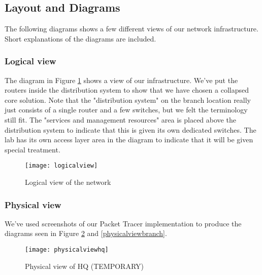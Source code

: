 \subsection{Layout and Diagrams}


The following diagrams shows a few different views of our network infrastructure. Short explanations of the diagrams are included.

\subsubsection{Logical view}


The diagram in Figure \ref{logicalview} shows a view of our infrastructure. We've put the routers inside the distribution system to show that we have chosen a collapsed core solution. Note that the "distribution system" on the branch location really just consists of a single router and a few switches, but we felt the terminology still fit. The "services and management resources" area is placed above the distribution system to indicate that this is given its own dedicated switches. The lab has its own access layer area in the diagram to indicate that it will be given special treatment.

\begin{figure}[H]
\caption{Logical view of the network}
\centreing
\texttt{[image: logicalview]}
\label{logicalview}
\end{figure}

\subsubsection{Physical view}

We've used screenshots of our Packet Tracer implementation to produce the diagrams seen in Figure \ref{physicalviewhq} and \ref{physicalviewbranch}.



\begin{figure}[H]
\caption{Physical view of HQ (TEMPORARY)}
\centreing
\texttt{[image: physicalviewhq]}
\label{physicalviewhq}
\end{figure}

